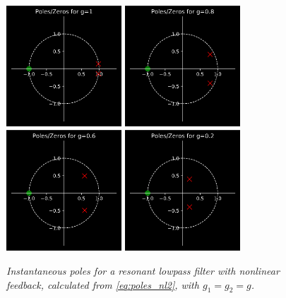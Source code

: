 \documentclass{IEEEtran}
\begin{document}
\begin{figure}[!ht]
    \includegraphics[width=1.7in]{../../NonlinearFeedback/Pics/pz1.png}
    \includegraphics[width=1.7in]{../../NonlinearFeedback/Pics/pz08.png}
    \includegraphics[width=1.7in]{../../NonlinearFeedback/Pics/pz06.png}
    \includegraphics[width=1.7in]{../../NonlinearFeedback/Pics/pz02.png}
    \caption{\label{pzPlots2}{\it Instantaneous poles for a resonant
                                lowpass filter with nonlinear feedback,
                                calculated from \cref{eq:poles_nl2},
                                with $g_1 = g_2 = g$.}}
\end{figure}
%
\end{document}
